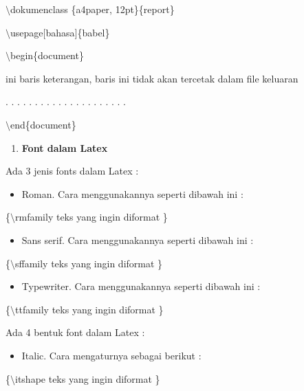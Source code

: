 $\setminus$dokumenclass \{a4paper, 12pt\}\{report\}\par \vspace{12pt}

$\setminus$usepage$[$bahasa$]$\{babel\}\par \vspace{12pt}

$\setminus$begin\{document\}\par \vspace{12pt}

ini baris keterangan, baris ini tidak akan tercetak dalam file 
keluaran

. . . . . . . . . . . . . . . . . . . . .\par \vspace{12pt}

$\setminus$end\{document\}

\begin{enumerate}
\setcounter{enumi}{\thenumberedCntB}
\item \textbf{Font dalam Latex}
\setcounter{numberedCntB}{\theenumi}
\end{enumerate}
Ada 3 jenis fonts dalam Latex :

\begin{itemize}
\item Roman. Cara menggunakannya seperti dibawah ini :
\end{itemize}
\hspace{0,5in}\{$\setminus$rmfamily teks yang ingin diformat \}

\begin{itemize}
\item Sans serif. Cara menggunakannya seperti dibawah ini :
\end{itemize}
\hspace{0,5in}\{$\setminus$sffamily teks yang ingin diformat \}

\begin{itemize}
\item Typewriter. Cara menggunakannya seperti dibawah ini :
\end{itemize}
\hspace{0,5in}\{$\setminus$ttfamily teks yang ingin diformat \}\par \vspace{12pt}



Ada 4 bentuk font dalam Latex :

\begin{itemize}
\item Italic. Cara mengaturnya sebagai berikut :
\end{itemize}
\hspace{0,5in}\{$\setminus$itshape teks yang ingin diformat \}

